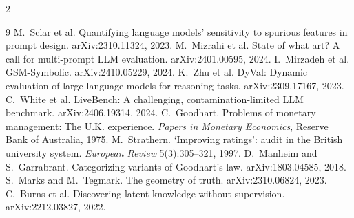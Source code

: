 \documentclass[10pt]{article}
\begin{document}
{\begin{multicols}{2}
\begin{thebibliography}{9}
 M.~Sclar et al. Quantifying language models' sensitivity to spurious features in prompt design. arXiv:2310.11324, 2023.
 M.~Mizrahi et al. State of what art? A call for multi-prompt LLM evaluation. arXiv:2401.00595, 2024.
 I.~Mirzadeh et al. GSM-Symbolic. arXiv:2410.05229, 2024.
 K.~Zhu et al. DyVal: Dynamic evaluation of large language models for reasoning tasks. arXiv:2309.17167, 2023.
 C.~White et al. LiveBench: A challenging, contamination-limited LLM benchmark. arXiv:2406.19314, 2024.
 C.~Goodhart. Problems of monetary management: The U.K. experience. \textit{Papers in Monetary Economics}, Reserve Bank of Australia, 1975.
 M.~Strathern. `Improving ratings': audit in the British university system. \textit{European Review} 5(3):305--321, 1997.
 D.~Manheim and S.~Garrabrant. Categorizing variants of Goodhart's law. arXiv:1803.04585, 2018.
 S.~Marks and M.~Tegmark. The geometry of truth. arXiv:2310.06824, 2023.
 C.~Burns et al. Discovering latent knowledge without supervision. arXiv:2212.03827, 2022.
\end{thebibliography}\end{multicols}}
\end{document}
